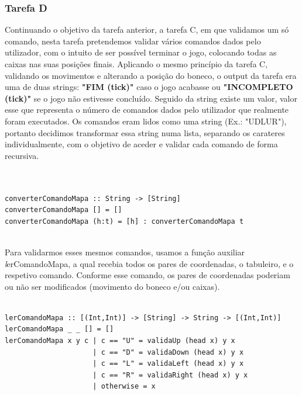 \documentclass[a4paper]{article}
\begin{document}
\subsubsection{Tarefa D}

Continuando o objetivo da tarefa anterior, a tarefa C, em que validamos um só comando, nesta tarefa pretendemos validar vários comandos dados pelo utilizador, com o intuito de ser possível terminar o jogo, colocando todas as caixas nas suas posições finais. Aplicando o mesmo princípio da tarefa C, validando os movimentos e alterando a posição do boneco, o output da tarefa era uma de duas strings: \textbf{"FIM (tick)"} caso o jogo acabasse ou \textbf{"INCOMPLETO (tick)"} se o jogo não estivesse concluído. Seguido da string existe um valor, valor esse que representa o número de comandos dados pelo utilizador que realmente foram executados. Os comandos eram lidos como uma string (Ex.: "UDLUR"), portanto decidimos transformar essa string numa lista, separando os carateres individualmente, com o objetivo de aceder e validar cada comando de forma recursiva. \par


\begin{Verbatim}


converterComandoMapa :: String -> [String]
converterComandoMapa [] = []
converterComandoMapa (h:t) = [h] : converterComandoMapa t


\end{Verbatim}


Para validarmos esses mesmos comandos, usamos a função auxiliar \textit lerComandoMapa, a qual recebia todos os pares de coordenadas, o tabuleiro, e o respetivo comando. Conforme esse comando, os pares de coordenadas poderiam ou não ser modificados (movimento do boneco e/ou caixas).

\begin{Verbatim}

lerComandoMapa :: [(Int,Int)] -> [String] -> String -> [(Int,Int)]
lerComandoMapa _ _ [] = []
lerComandoMapa x y c | c == "U" = validaUp (head x) y x
                     | c == "D" = validaDown (head x) y x  
                     | c == "L" = validaLeft (head x) y x
                     | c == "R" = validaRight (head x) y x 
                     | otherwise = x
\end{Verbatim}
\end{document}
